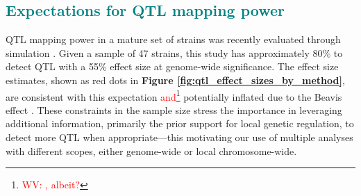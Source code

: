 \documentclass[9pt,twocolumn,twoside]{gsajnl}
\newcommand{\WV}[2]{\textcolor{red}{#1\footnote{\textcolor{red}{WV: #2}}}}
\newcommand{\GKinline}[1]{\textcolor{teal}{#1}}
\begin{document}
\subsection{\GKinline{Expectations for QTL mapping power}}

QTL mapping power in a mature set of strains was recently evaluated through simulation \citep{Keele2019}. Given a sample of 47 strains, this study has approximately 80\% to detect QTL with a 55\% effect size at genome-wide significance. The effect size estimates, shown as red dots in \textbf{Figure \ref{fig:qtl_effect_sizes_by_method}}, are consistent with this expectation \WV{and}{, albeit?} potentially inflated due to the Beavis effect \citep{Xu2003}. These constraints in the sample size stress the importance in leveraging additional information, primarily the prior support for local genetic regulation, to detect more QTL when appropriate---this motivating our use of multiple analyses with different scopes, either genome-wide or local chromosome-wide.

%

\end{document}
